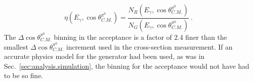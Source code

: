 \begin{equation}\label{eq:acceptance}
    \eta(E_\gamma,\cos\theta^{\pi^0}_{C.M.}) = \frac{N_R(E_\gamma,\cos\theta^{\pi^0}_{C.M.})}{N_G(E_\gamma,\cos\theta^{\pi^0}_{C.M.})} \ .
\end{equation}
The $\Delta\cos\theta^{\pi^0}_{C.M.}$ binning in the acceptance is a factor of 2.4 finer than the smallest $\Delta\cos\theta^{\pi^0}_{C.M.}$ increment used in the cross-section measurement. If an accurate physics model for the generator had been used, as was in Sec.~\ref{sec:analysis.simulation}, the binning for the acceptance  would not have had to be so fine.

